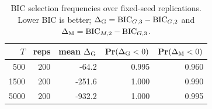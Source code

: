 \begin{table}[t]
\centering
\small
\caption{BIC selection frequencies over fixed-seed replications. Lower BIC is better; $\Delta_{\rm G}=\mathrm{BIC}_{G,3}-\mathrm{BIC}_{G,2}$ and $\Delta_{\rm M}=\mathrm{BIC}_{M,2}-\mathrm{BIC}_{G,3}$.}
\label{tab:replications}
\begin{tabular}{rrrrr}
\toprule
$T$ & reps & mean $\Delta_{\rm G}$ & Pr$(\Delta_{\rm G}<0)$ & Pr$(\Delta_{\rm M}<0)$\\
\midrule
500 & 200 & -64.2 & 0.995 & 0.960\\
1500 & 200 & -251.6 & 1.000 & 0.990\\
5000 & 200 & -932.2 & 1.000 & 0.995\\
\bottomrule
\end{tabular}
\end{table}

